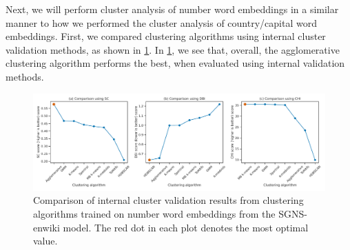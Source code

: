 Next, we will perform cluster analysis of number word embeddings in a similar manner to how we performed the cluster analysis of country/capital word embeddings. First, we compared clustering algorithms using internal cluster validation methods, as shown in \cref{fig:cluster-analysis-numbers-word-group-internal-cluster-validation}. In \cref{fig:cluster-analysis-numbers-word-group-internal-cluster-validation}, we see that, overall, the agglomerative clustering algorithm performs the best, when evaluated using internal validation methods.
\begin{figure}[H]
    \centering
    \includegraphics[width=\textwidth]{thesis/figures/cluster-analysis-numbers-word-group-internal-cluster-validation.pdf}
    \caption{Comparison of internal cluster validation results from clustering algorithms trained on number word embeddings from the SGNS-enwiki model. The red dot in each plot denotes the most optimal value.}
    \label{fig:cluster-analysis-numbers-word-group-internal-cluster-validation}
\end{figure}

